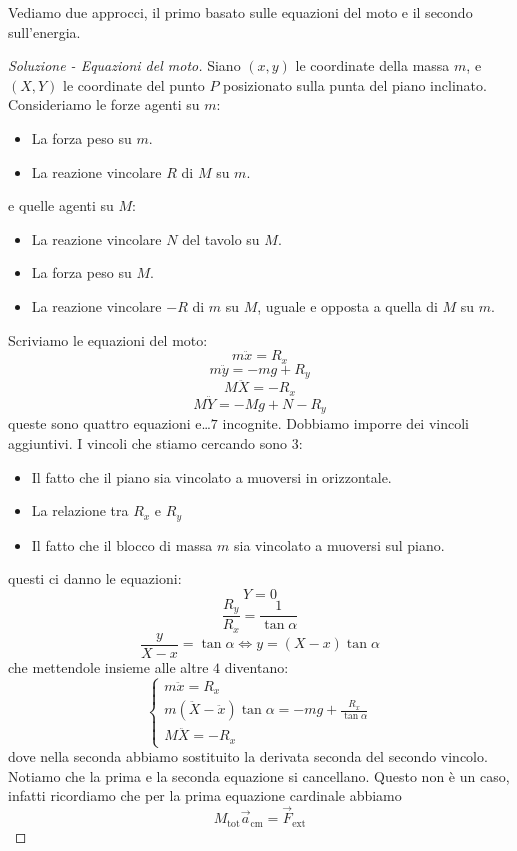 \documentclass[11pt]{scrartcl}
\begin{document}
	\begin{sol}
		Vediamo due approcci, il primo basato sulle equazioni del moto e il secondo sull'energia.
		\begin{proof}[Soluzione - Equazioni del moto]
			Siano $(x,y)$ le coordinate della massa $m$, e $(X,Y)$ le coordinate del punto $P$ posizionato sulla punta del piano inclinato. Consideriamo le forze agenti su $m$:
			\begin{itemize}
				\item La forza peso su $m$.
				\item La reazione vincolare $R$ di $M$ su $m$.
			\end{itemize}
			e quelle agenti su $M$:
			\begin{itemize}
				\item La reazione vincolare $N$ del tavolo su $M$.
				\item La forza peso su $M$.
				\item La reazione vincolare $-R$ di $m$ su $M$, uguale e opposta a quella di $M$ su $m$.
			\end{itemize}
			Scriviamo le equazioni del moto:
			$$m\ddot{x}=R_x$$
			$$m\ddot{y}=-mg+R_y$$
			$$M\ddot{X}=-R_x$$
			$$M\ddot{Y}=-Mg+N-R_y$$
			queste sono quattro equazioni e\dots $7$ incognite. Dobbiamo imporre dei vincoli aggiuntivi. I vincoli che stiamo cercando sono $3$:
			\begin{itemize}
				\item Il fatto che il piano sia vincolato a muoversi in orizzontale.
				\item La relazione tra $R_x$ e $R_y$
				\item Il fatto che il blocco di massa $m$ sia vincolato a muoversi sul piano.
			\end{itemize}
			questi ci danno le equazioni:
			$$Y=0$$
			$$\frac{R_y}{R_x}=\frac{1}{\tan \alpha}$$
			$$\frac{y}{X-x}=\tan \alpha \iff y=(X-x)\tan \alpha$$
			che mettendole insieme alle altre $4$ diventano:
			$$
			\begin{cases}
				m\ddot{x}=R_x \\
				m(\ddot{X}-\ddot{x})\tan\alpha=-mg+\frac{R_x}{\tan\alpha} \\
				M\ddot{X}=-R_x
			\end{cases}
			$$
			dove nella seconda abbiamo sostituito la derivata seconda del secondo vincolo.  Notiamo che la prima e la seconda equazione si cancellano. Questo non è un caso, infatti ricordiamo che per la prima equazione cardinale abbiamo
			$$M_{\text{tot}}\vec{a}_\text{cm}=\vec{F}_\text{ext}$$

\end{proof}
\end{sol}
\end{document}
